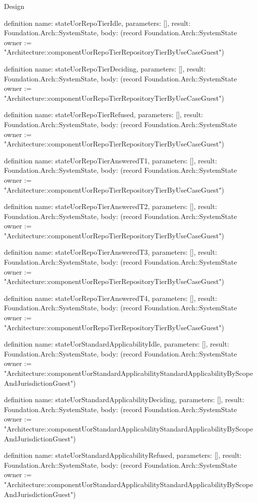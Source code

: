 \begin{lexlean}{Design}
\begin{semanticmodule}
definition{
  name: stateUorRepoTierIdle,
  parameters: [],
  result: Foundation.Arch::SystemState,
  body: (record Foundation.Arch::SystemState {owner := "Architecture::componentUorRepoTierRepositoryTierByUseCaseGuest"})
}

definition{
  name: stateUorRepoTierDeciding,
  parameters: [],
  result: Foundation.Arch::SystemState,
  body: (record Foundation.Arch::SystemState {owner := "Architecture::componentUorRepoTierRepositoryTierByUseCaseGuest"})
}

definition{
  name: stateUorRepoTierRefused,
  parameters: [],
  result: Foundation.Arch::SystemState,
  body: (record Foundation.Arch::SystemState {owner := "Architecture::componentUorRepoTierRepositoryTierByUseCaseGuest"})
}

definition{
  name: stateUorRepoTierAnsweredT1,
  parameters: [],
  result: Foundation.Arch::SystemState,
  body: (record Foundation.Arch::SystemState {owner := "Architecture::componentUorRepoTierRepositoryTierByUseCaseGuest"})
}

definition{
  name: stateUorRepoTierAnsweredT2,
  parameters: [],
  result: Foundation.Arch::SystemState,
  body: (record Foundation.Arch::SystemState {owner := "Architecture::componentUorRepoTierRepositoryTierByUseCaseGuest"})
}

definition{
  name: stateUorRepoTierAnsweredT3,
  parameters: [],
  result: Foundation.Arch::SystemState,
  body: (record Foundation.Arch::SystemState {owner := "Architecture::componentUorRepoTierRepositoryTierByUseCaseGuest"})
}

definition{
  name: stateUorRepoTierAnsweredT4,
  parameters: [],
  result: Foundation.Arch::SystemState,
  body: (record Foundation.Arch::SystemState {owner := "Architecture::componentUorRepoTierRepositoryTierByUseCaseGuest"})
}

definition{
  name: stateUorStandardApplicabilityIdle,
  parameters: [],
  result: Foundation.Arch::SystemState,
  body: (record Foundation.Arch::SystemState {owner := "Architecture::componentUorStandardApplicabilityStandardApplicabilityByScopeAndJurisdictionGuest"})
}

definition{
  name: stateUorStandardApplicabilityDeciding,
  parameters: [],
  result: Foundation.Arch::SystemState,
  body: (record Foundation.Arch::SystemState {owner := "Architecture::componentUorStandardApplicabilityStandardApplicabilityByScopeAndJurisdictionGuest"})
}

definition{
  name: stateUorStandardApplicabilityRefused,
  parameters: [],
  result: Foundation.Arch::SystemState,
  body: (record Foundation.Arch::SystemState {owner := "Architecture::componentUorStandardApplicabilityStandardApplicabilityByScopeAndJurisdictionGuest"})
}


\end{semanticmodule}
\end{lexlean}
